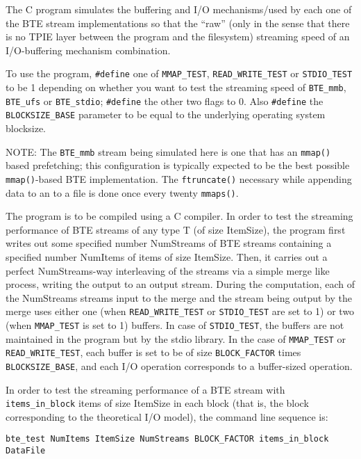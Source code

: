 The C program simulates the buffering and I/O mechanisms/used by each 
one of the BTE stream implementations so that the ``raw'' (only in the 
sense that there is no TPIE layer between
the program and the filesystem) streaming speed of an 
I/O-buffering mechanism combination.

To use the program,  \verb|#define| one of  \verb|MMAP_TEST|,
\verb|READ_WRITE_TEST| or  \verb|STDIO_TEST|
 to be 1 depending on whether you want to test the streaming
speed of  \verb|BTE_mmb|, \verb|BTE_ufs| or  \verb|BTE_stdio|;
\verb|#define|  the other two 
flags to 0. Also \verb|#define| the \verb|BLOCKSIZE_BASE|
 parameter to be equal to the underlying operating system blocksize. 

NOTE: The \verb|BTE_mmb| stream being simulated here is one that has 
an \verb|mmap()| based prefetching; this configuration is typically expected
to be the best possible \verb|mmap()|-based BTE implementation. The \verb|ftruncate()|
necessary while appending data to an to a file is done once every
twenty \verb|mmaps()|.  

The program is to be compiled using a C compiler. In order to test the streaming 
performance of  BTE streams of any type T (of size ItemSize), the program 
first writes out some specified number NumStreams of BTE streams containing 
a specified number NumItems of items of size ItemSize. Then, it carries
out a perfect NumStreams-way interleaving of the streams via a simple
merge like process, writing the output to an output stream. During the 
computation, each of the NumStreams streams input to the merge and 
the stream being output by the merge uses either one (when \verb|READ_WRITE_TEST|
or \verb|STDIO_TEST| are set to 1)  or two (when \verb|MMAP_TEST| 
is set to 1) buffers.
In case of \verb|STDIO_TEST|, the buffers are not maintained in the program
but by the stdio library. In the case of \verb|MMAP_TEST| or \verb|READ_WRITE_TEST|,
each buffer is set to be of size \verb|BLOCK_FACTOR| times \verb|BLOCKSIZE_BASE|, and
each I/O operation corresponds to a buffer-sized operation. 

In order to test the streaming performance of a BTE stream with 
\verb|items_in_block| items of size ItemSize in each block (that is, the
block corresponding to the theoretical I/O model), the command line 
sequence is:

\begin{verbatim}
bte_test NumItems ItemSize NumStreams BLOCK_FACTOR items_in_block DataFile 
\end{verbatim}

